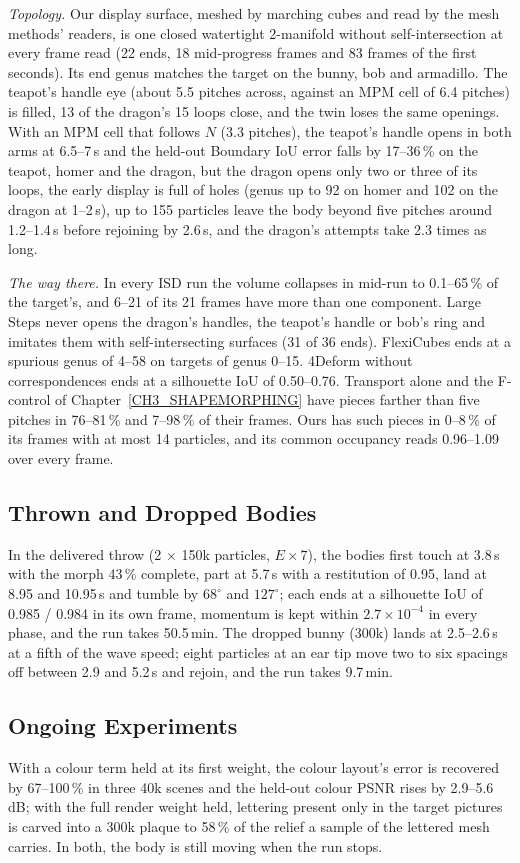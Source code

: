 \textit{Topology.} Our display surface, meshed by marching cubes and read by the mesh methods' readers, is one closed watertight
2-manifold without self-intersection at every frame read (22 ends, 18 mid-progress frames and 83 frames of the first seconds).
Its end genus matches the target on the bunny, bob and armadillo. The teapot's handle eye (about 5.5 pitches across, against an
MPM cell of 6.4 pitches) is filled, 13 of the dragon's 15 loops close, and the twin loses the same openings. With an MPM cell
that follows $N$ (3.3 pitches), the teapot's handle opens in both arms at 6.5--7\,s and the held-out Boundary IoU error falls by
17--36\,\% on the teapot, homer and the dragon, but the dragon opens only two or three of its loops, the early display is full of
holes (genus up to 92 on homer and 102 on the dragon at 1--2\,s), up to 155 particles leave the body beyond five pitches around
1.2--1.4\,s before rejoining by 2.6\,s, and the dragon's attempts take 2.3 times as long.

\textit{The way there.} In every ISD run the volume collapses in mid-run to 0.1--65\,\% of the target's, and 6--21 of its 21
frames have more than one component. Large Steps never opens the dragon's handles, the teapot's handle or bob's ring and imitates
them with self-intersecting surfaces (31 of 36 ends). FlexiCubes ends at a spurious genus of 4--58 on targets of genus 0--15.
4Deform without correspondences ends at a silhouette IoU of 0.50--0.76. Transport alone and the F-control of
Chapter~\ref{CH3_SHAPEMORPHING} have pieces farther than five pitches in 76--81\,\% and 7--98\,\% of their frames. Ours has such
pieces in 0--8\,\% of its frames with at most 14 particles, and its common occupancy reads 0.96--1.09 over every frame.

\subsection{Thrown and Dropped Bodies}
In the delivered throw (2 $\times$ 150k particles, $E\times7$), the bodies first touch at 3.8\,s with the morph 43\,\% complete,
part at 5.7\,s with a restitution of 0.95, land at 8.95 and 10.95\,s and tumble by $68^\circ$ and $127^\circ$; each ends at a
silhouette IoU of 0.985 / 0.984 in its own frame, momentum is kept within $2.7\times10^{-4}$ in every phase, and the run takes
50.5\,min. The dropped bunny (300k) lands at 2.5--2.6\,s at a fifth of the wave speed; eight particles at an ear tip move two to
six spacings off between 2.9 and 5.2\,s and rejoin, and the run takes 9.7\,min.

\subsection{Ongoing Experiments}
With a colour term held at its first weight, the colour layout's error is recovered by 67--100\,\% in three 40k scenes and the
held-out colour PSNR rises by 2.9--5.6\,dB; with the full render weight held, lettering present only in the target pictures is
carved into a 300k plaque to 58\,\% of the relief a sample of the lettered mesh carries. In both, the body is still moving when
the run stops.
